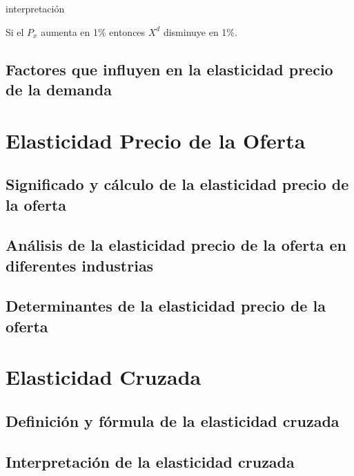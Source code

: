 \documentclass[
  jou,
  floatsintext,
  longtable,
  a4paper,
  nolmodern,
  notxfonts,
  notimes,
  colorlinks=true,linkcolor=blue,citecolor=blue,urlcolor=blue]{apa7}
\begin{document}
interpretación

Si el \(P_x\) aumenta en 1\% entonces \(X^d\) disminuye en 1\%.

\subsection{Factores que influyen en la elasticidad precio de la
demanda}\label{factores-que-influyen-en-la-elasticidad-precio-de-la-demanda}

\section{Elasticidad Precio de la
Oferta}\label{elasticidad-precio-de-la-oferta}

\subsection{Significado y cálculo de la elasticidad precio de la
oferta}\label{significado-y-cuxe1lculo-de-la-elasticidad-precio-de-la-oferta}

\subsection{Análisis de la elasticidad precio de la oferta en diferentes
industrias}\label{anuxe1lisis-de-la-elasticidad-precio-de-la-oferta-en-diferentes-industrias}

\subsection{Determinantes de la elasticidad precio de la
oferta}\label{determinantes-de-la-elasticidad-precio-de-la-oferta}

\section{Elasticidad Cruzada}\label{elasticidad-cruzada}

\subsection{Definición y fórmula de la elasticidad
cruzada}\label{definiciuxf3n-y-fuxf3rmula-de-la-elasticidad-cruzada}

\subsection{Interpretación de la elasticidad
cruzada}\label{interpretaciuxf3n-de-la-elasticidad-cruzada}
\end{document}
